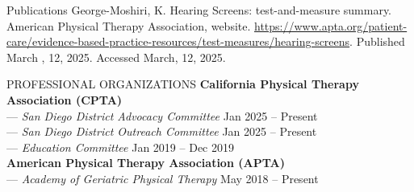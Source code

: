 \documentclass{resume} %
\begin{document}






\begin{rSection}{Publications}
George-Moshiri, K. Hearing Screens: test-and-measure summary. American
Physical Therapy Association, website. \href{https://www.apta.org/patient-care/evidence-based-practice-resources/test-measures/hearing-screens}{https://www.apta.org/patient-care/evidence-based-practice-resources/test-measures/hearing-screens}. Published March , 12, 2025. Accessed March, 12, 2025.
\end{rSection}

\begin{rSection}{PROFESSIONAL ORGANIZATIONS}
\textbf{California Physical Therapy Association (CPTA)}\\
\-\hspace{5mm} --- \textit{San Diego District Advocacy Committee} \hfill{Jan 2025 -- Present}\\
\-\hspace{5mm} --- \textit{San Diego District Outreach Committee} \hfill{Jan 2025 -- Present}\\
\-\hspace{5mm} --- \textit{Education Committee} \hfill{Jan 2019 -- Dec 2019}\\
\textbf{American Physical Therapy Association (APTA)}\\
\-\hspace{5mm} --- \textit{Academy of Geriatric Physical Therapy}  \hfill{May 2018 -- Present}\\
\end{rSection} 
\end{document}
